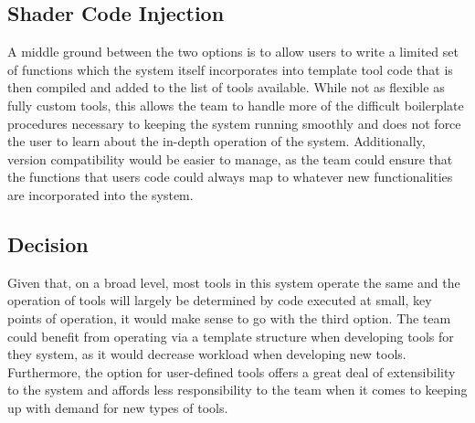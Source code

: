 \documentclass[onecolumn, draftclsnofoot,10pt, compsoc]{IEEEtran}
\begin{document}
\subsection{Shader Code Injection}
A middle ground between the two options is to allow users to write a limited set of functions which the system itself incorporates into template tool code that is then compiled and added to the list of tools available. While not as flexible as fully custom tools, this allows the team to handle more of the difficult boilerplate procedures necessary to keeping the system running smoothly and does not force the user to learn about the in-depth operation of the system. Additionally, version compatibility would be easier to manage, as the team could ensure that the functions that users code could always map to whatever new functionalities are incorporated into the system.



\subsection{Decision}
Given that, on a broad level, most tools in this system operate the same and the operation of tools will largely be determined by code executed at small, key points of operation, it would make sense to go with the third option. The team could benefit from operating via a template structure when developing tools for they system, as it would decrease workload when developing new tools. Furthermore, the option for user-defined tools offers a great deal of extensibility to the system and affords less responsibility to the team when it comes to keeping up with demand for new types of tools. \cite{1} \cite{2} \cite{3} \cite{4}



{}
\end{document}
